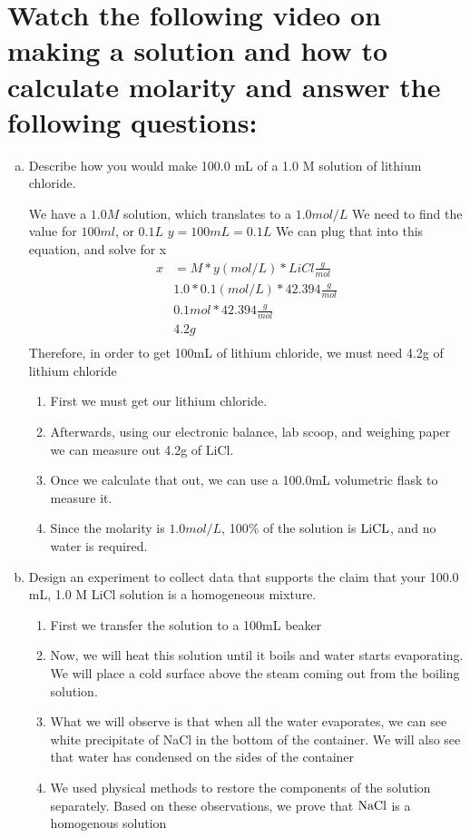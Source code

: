 \documentclass{scrartcl}
\begin{document}
\section{Watch the following video on making a solution and how to calculate molarity and answer the following questions:}
\label{sec:org42dd7d0}
\begin{enumerate}[(a)]
\item Describe how you would make 100.0 mL of a 1.0 M solution of lithium chloride.

We have a \(1.0M\) solution, which translates to  a \(1.0mol/L\)
We need to find the value for \(100ml\), or \(0.1L\)
\(y = 100mL = 0.1L\)
We can plug that into this equation, and solve for x
\begin{align*}
x&= M * y(mol/L) * LiCl\frac{g}{mol}\\
&1.0 * 0.1(mol/L) * 42.394\frac{g}{mol}\\
&0.1mol * 42.394\frac{g}{mol}\\
&4.2g\\
\end{align*}
 Therefore, in order to get 100mL of lithium chloride, we must need 4.2g of
lithium chloride
\begin{enumerate}[1]
\item First we must get our lithium chloride.
\item Afterwards, using our electronic balance, lab scoop, and weighing paper we can measure out 4.2g of LiCl.
\item Once we calculate that out, we can use a 100.0mL volumetric flask to measure it.
\item Since the molarity is \(1.0mol/L\), 100\% of the solution is \(\ce{LiCL}\), and no
water is required.
\end{enumerate}

\item Design an experiment to collect data that supports the claim that your 100.0
mL, 1.0 M LiCl solution is a homogeneous mixture.
\begin{enumerate}[1]
\item First we transfer the solution to a 100mL beaker
\item Now, we will heat this solution until it boils and water starts
evaporating. We will place a cold surface above the steam coming out from
the boiling solution.
\item What we will observe is that when all the water evaporates, we can see
white precipitate of NaCl in the bottom of the container. We will also
see that water has condensed on the sides of the container
\item We used physical methods to restore the components of the solution
separately. Based on these observations, we prove that \(\ce{NaCl}\) is a
homogenous solution
\end{enumerate}
\end{enumerate}
\end{document}
